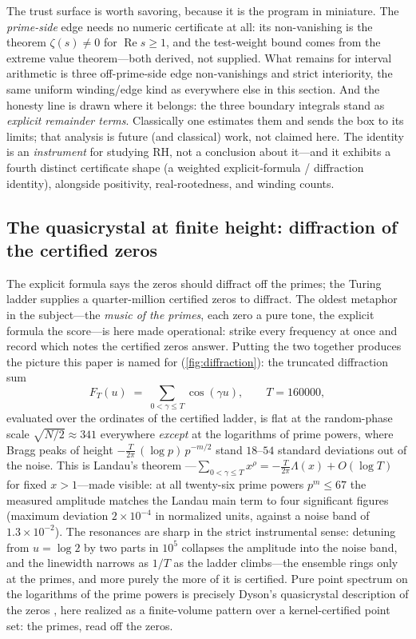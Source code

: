 The trust surface is worth savoring, because it is the program in miniature. The
\emph{prime-side} edge needs no numeric certificate at all: its non-vanishing is
the theorem $\zeta(s) \ne 0$ for $\operatorname{Re} s \ge 1$, and the test-weight
bound comes from the extreme value theorem---both derived, not supplied. What
remains for interval arithmetic is three off-prime-side edge non-vanishings and
strict interiority, the same uniform winding/edge kind as everywhere else in this
section. And the honesty line is drawn where it belongs: the three boundary
integrals stand as \emph{explicit remainder terms}. Classically one estimates
them and sends the box to its limits; that analysis is future (and classical)
work, not claimed here. The identity is an \emph{instrument} for studying RH, not
a conclusion about it---and it exhibits a fourth distinct certificate shape (a
weighted explicit-formula / diffraction identity), alongside positivity,
real-rootedness, and winding counts.

\subsection{The quasicrystal at finite height: diffraction of the certified zeros}
\label{sec:diffraction}

The explicit formula says the zeros should diffract off the primes; the Turing
ladder supplies a quarter-million certified zeros to diffract. The oldest
metaphor in the subject---the \emph{music of the primes}, each zero a pure
tone, the explicit formula the score---is here made operational: strike every
frequency at once and record which notes the certified zeros answer. Putting
the two together produces the picture this paper is named for
(\cref{fig:diffraction}): the truncated diffraction sum
\[
  F_T(u) \;=\; \sum_{0 < \gamma \le T} \cos(\gamma u),
  \qquad T = 160000,
\]
evaluated over the \ladderCount{} ordinates of the certified ladder, is flat at
the random-phase scale $\sqrt{N/2} \approx 341$ everywhere \emph{except} at the
logarithms of prime powers, where Bragg peaks of height
$-\tfrac{T}{2\pi}\,(\log p)\,p^{-m/2}$ stand $18$--$54$ standard deviations out
of the noise. This is Landau's theorem
\cite{landau1912}---$\sum_{0<\gamma\le T} x^{\rho} = -\tfrac{T}{2\pi}\Lambda(x)
+ O(\log T)$ for fixed $x > 1$---made visible: at all twenty-six prime powers
$p^m \le 67$ the measured amplitude matches the Landau main term to four
significant figures (maximum deviation $2\times10^{-4}$ in normalized units,
against a noise band of $1.3\times10^{-2}$). The resonances are sharp in the
strict instrumental sense: detuning from $u = \log 2$ by two parts in
$10^{5}$ collapses the amplitude into the noise band, and the linewidth
narrows as $1/T$ as the ladder climbs---the ensemble rings only at the
primes, and more purely the more of it is certified. Pure point spectrum on the
logarithms of the prime powers is precisely Dyson's quasicrystal description of
the zeros \cite{dyson2009}, here realized as a finite-volume pattern over a
kernel-certified point set: the primes, read off the zeros.

